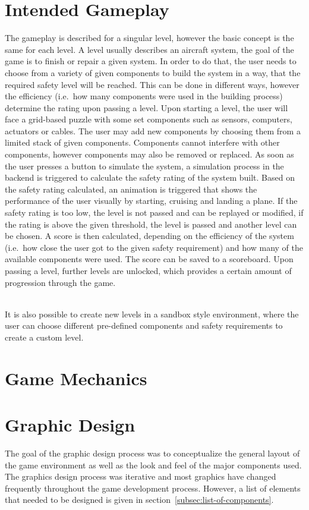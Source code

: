 \section{Intended Gameplay}\label{sec:intended-gameplay}
The gameplay is described for a singular level, however the basic concept is the same for each level.
A level usually describes an aircraft system, the goal of the game is to finish or repair a given system.
In order to do that, the user needs to choose from a variety of given components to build the system in a way, that the
required safety level will be reached.
This can be done in different ways, however the efficiency (i.e.\ how many components were used in the building process) determine
the rating upon passing a level.
Upon starting a level, the user will face a grid-based puzzle with some set components such as sensors, computers, actuators
or cables.
The user may add new components by choosing them from a limited stack of given components.
Components cannot interfere with other components, however components may also be removed or replaced.
As soon as the user presses a button to simulate the system, a simulation process in the backend is triggered to calculate
the safety rating of the system built.
Based on the safety rating calculated, an animation is triggered that shows the performance of the user visually by starting, cruising
and landing a plane.
If the safety rating is too low, the level is not passed and can be replayed or modified, if the rating is above the given
threshold, the level is passed and another level can be chosen.
A score is then calculated, depending on the efficiency of the system (i.e.\ how close the user got to the given safety requirement) and
how many of the available components were used.
The score can be saved to a scoreboard.
Upon passing a level, further levels are unlocked, which provides a certain amount of progression through the game.

\\

It is also possible to create new levels in a sandbox style environment, where the user can choose different pre-defined components and
safety requirements to create a custom level.

\section{Game Mechanics}\label{sec:game-mechanics}

\section{Graphic Design}\label{sec:graphic-design}
The goal of the graphic design process was to conceptualize the general layout of the game environment as well as the look and feel
of the major components used.
The graphics design process was iterative and most graphics have changed frequently throughout the game development process.
However, a list of elements that needed to be designed is given in section~\ref{subsec:list-of-components}.

